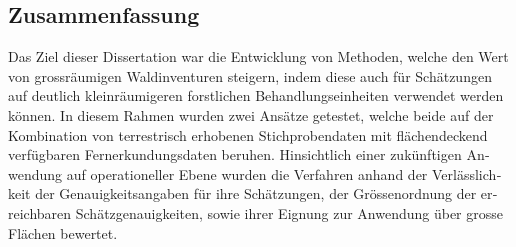 \begin{otherlanguage}{ngerman}
\chapter*{Zusammenfassung}
\label{chap:Zusammenfassung}

Das Ziel dieser Dissertation war die Entwicklung von Methoden, welche den Wert von grossräumigen Waldinventuren steigern, indem diese auch für Schätzungen auf deutlich kleinräumigeren forstlichen Behandlungseinheiten verwendet werden können. In diesem Rahmen wurden zwei Ansätze getestet, welche beide auf der Kombination von terrestrisch erhobenen Stichprobendaten mit flächendeckend verfügbaren Fernerkundungsdaten beruhen. Hinsichtlich einer zukünftigen Anwendung auf operationeller Ebene wurden die Verfahren anhand der Verlässlichkeit der Genauigkeitsangaben für ihre Schätzungen, der Grössenordnung der erreichbaren Schätzgenauigkeiten, sowie ihrer Eignung zur Anwendung über grosse Flächen bewertet.\par


\end{otherlanguage}
